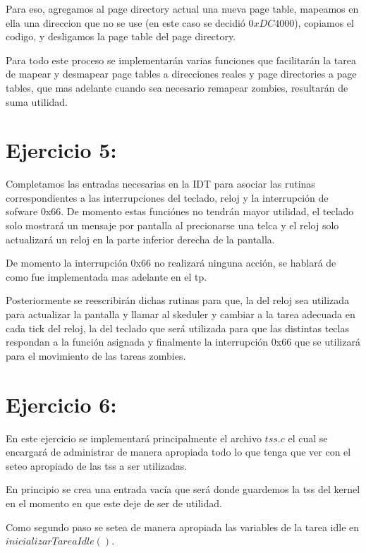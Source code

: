 \documentclass[a4paper]{article}
\begin{document}
Para eso, agregamos al page directory actual una nueva page table, mapeamos en ella una direccion que no se use (en este caso se decidió $0xDC4000$), copiamos el codigo, y desligamos la page table del page directory.

Para todo este proceso se implementarán varias funciones que facilitarán la tarea de mapear y desmapear page tables a direcciones reales y page directories a page tables, que mas adelante cuando sea necesario remapear zombies, resultarán de suma utilidad.

\clearpage

\section{Ejercicio 5:}
%

Completamos las entradas necesarias en la IDT para asociar las rutinas correspondientes a las interrupciones del teclado, reloj y la interrupción de sofware 0x66. De momento estas funciónes no tendrán mayor utilidad, el teclado solo mostrará un mensaje por pantalla al precionarse una telca y el reloj solo actualizará un reloj en la parte inferior derecha de la pantalla.

De momento la interrupción 0x66 no realizará ninguna acción, se hablará de como fue implementada mas adelante en el tp.

Posteriormente se reescribirán dichas rutinas para que, la del reloj sea utilizada para actualizar la pantalla y llamar al skeduler y cambiar a la tarea adecuada en cada tick del reloj, la del teclado que será utilizada para que las distintas teclas respondan a la función asignada y finalmente la interrupción 0x66 que se utilizará para el movimiento de las tareas zombies.

\clearpage

\section{Ejercicio 6:}

En este ejercicio se implementará principalmente el archivo $tss.c$ el cual se encargará de administrar de manera apropiada todo lo que tenga que ver con el seteo apropiado de las tss a ser utilizadas.

En principio se crea una entrada vacía que será donde guardemos la tss del kernel en el momento en que este deje de ser de utilidad.

Como segundo paso se setea de manera apropiada las variables de la tarea idle en $inicializarTareaIdle()$.
\end{document}

